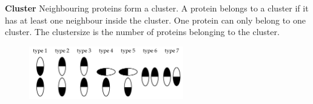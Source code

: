 \textbf{Cluster} Neighbouring proteins form a cluster. A protein belongs to a cluster if it has at least one neighbour inside the cluster. One protein can only belong to one cluster. The clustersize is the number of proteins belonging to the cluster.
%
%
%
\begin{figure}
	\centering
	\includegraphics[width=0.6\textwidth]{figures/introduction/classification}
	\label{methods:inttypes}
\end{figure}
%
%
%